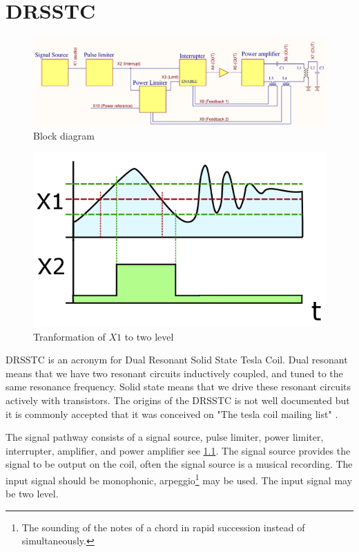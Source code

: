 \chapter{DRSSTC}
\label{DRSSTC}

\begin{figure}
    \centering
    \includegraphics[width=\textwidth]{Skjema/FunksjonsBlokkskjema.pdf}
    \caption{Block diagram}
    \label{fig:func_block}
\end{figure}

\begin{figure}
    \centering
    \includegraphics[width=\textwidth]{img/Smitt_hysteresis_graph_x1_x2.png}
    \caption{Tranformation of $X1$ to two level \citep{wikimedia}}       
    \label{fig:schmidt}
\end{figure}


DRSSTC is an acronym for Dual Resonant Solid State Tesla Coil. Dual resonant means that we have two resonant circuits inductively coupled, and tuned to the same resonance frequency. Solid state means that we drive these resonant circuits actively with transistors. The origins of the DRSSTC is not well documented but it is commonly accepted that it was conceived on "The tesla coil mailing list" \citep{pupman}.

The signal pathway consists of a signal source, pulse limiter, power limiter, interrupter, amplifier, and power amplifier see \cref{fig:func_block}.
The signal source provides the signal to be output on the coil, often the signal source is a musical recording.
The input signal should be monophonic, arpeggio\footnote{The sounding of the notes of a chord in rapid succession instead of simultaneously.} may be used. The input signal may be two level.

